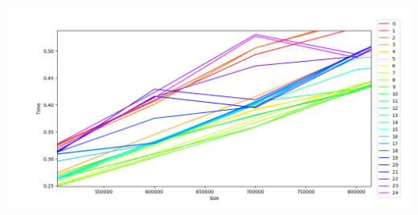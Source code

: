\documentclass[a4paper,11pt]{article}
\begin{document}
\includegraphics[scale = 0.23]{Figure_3.png}
\end{document}
